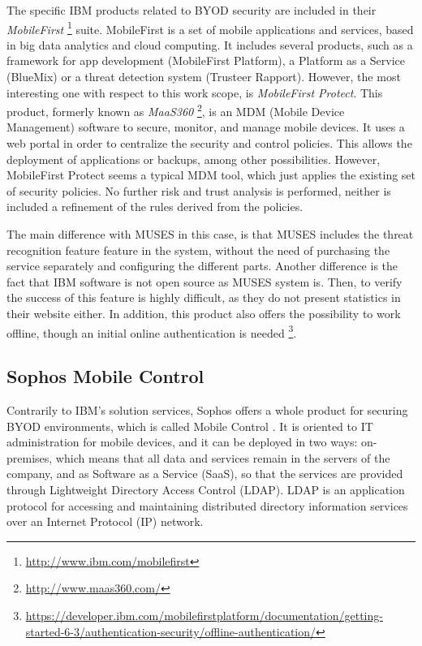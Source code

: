 The specific IBM products related to BYOD security are included in their {\em MobileFirst} \footnote{\url{http://www.ibm.com/mobilefirst}} suite. MobileFirst is a set of mobile applications and services, based in big data analytics and cloud computing. It includes several products, such as a framework for app development (MobileFirst Platform), a Platform as a Service (BlueMix) or a threat detection system (Trusteer Rapport). %
 However, the most interesting one with respect to this work scope, is {\em MobileFirst Protect}. This product, formerly known as {\em MaaS360} \footnote{\url{http://www.maas360.com/}}, is an MDM (Mobile Device Management) software to secure, monitor, and manage mobile devices. It uses a web portal in order to centralize the security and control policies. This allows the deployment of applications or backups, among other possibilities. However, MobileFirst Protect seems a typical MDM tool, which just applies the existing set of security policies. No further risk and trust analysis is performed, neither is included a refinement of the rules derived from the policies.

The main difference with MUSES in this case, is that MUSES includes the threat recognition feature feature in the system, without the need of purchasing the service separately and configuring the different parts. Another difference is the fact that IBM software is not open source as MUSES system is. Then, to verify the success of this feature is highly difficult, as they do not present statistics in their website either. In addition, this product also offers the possibility to work offline, though an initial online authentication is needed \footnote{\url{https://developer.ibm.com/mobilefirstplatform/documentation/getting-started-6-3/authentication-security/offline-authentication/}}. 
 

\subsection{Sophos Mobile Control}
\label{subsec:sophos}

Contrarily to IBM's solution services, Sophos offers a whole product for securing BYOD environments, which is called Mobile Control \cite{Sophos_tool}. It is oriented to IT administration for mobile devices, and it can be deployed in two ways: on-premises, which means that all data and services remain in the servers of the company, and as Software as a Service (SaaS), so that the services are provided through Lightweight Directory Access Control (LDAP). LDAP is an application protocol for accessing and maintaining distributed directory information services over an Internet Protocol (IP) network.

